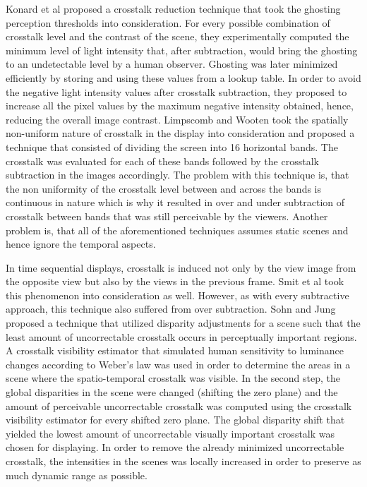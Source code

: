  Konard et al\cite{konrad2000cancellation} proposed a crosstalk reduction technique that took the ghosting perception thresholds into consideration. For every possible combination of crosstalk level and the contrast of the scene, they experimentally computed the minimum level of light intensity that, after subtraction, would bring the ghosting to an undetectable level by a human observer. Ghosting was later minimized efficiently by storing and using these values from a lookup table. In order to avoid the negative light intensity values after crosstalk subtraction, they proposed to increase all the pixel values by the maximum negative intensity obtained, hence, reducing the overall image contrast. Limpscomb and Wooten\cite{lipscomb1994reducing} took the spatially non-uniform nature of crosstalk in the display into consideration and proposed a technique that consisted of dividing the screen into 16 horizontal bands. The crosstalk was evaluated for each of these bands followed by the crosstalk subtraction in the images accordingly. The problem with this technique is, that the non uniformity of the crosstalk level between and across the bands is continuous in nature which is why it resulted in over and under subtraction of crosstalk between bands that was still perceivable by the viewers. Another problem is, that all of the aforementioned techniques assumes static scenes and hence ignore the temporal aspects.

 In time sequential displays, crosstalk is induced not only by the view image from the opposite view but also by the views in the previous frame. Smit et al\cite{smit2007non} took this phenomenon into consideration as well. However, as with every subtractive approach, this technique also suffered from over subtraction. Sohn and Jung\cite{sohn2014crosstalk} proposed a technique that utilized disparity adjustments for a scene such that the least amount of uncorrectable crosstalk occurs in perceptually important regions. A crosstalk visibility estimator that simulated human sensitivity to luminance changes according to Weber's law was used in order to determine the areas in a scene where the spatio-temporal crosstalk was visible. In the second step, the global disparities in the scene were changed (shifting the zero plane) and the amount of perceivable uncorrectable crosstalk was computed using the crosstalk visibility estimator for every shifted zero plane. The global disparity shift that yielded the lowest amount of uncorrectable visually important crosstalk was chosen for displaying. In order to remove the already minimized uncorrectable crosstalk, the intensities in the scenes was locally increased in order to preserve as much dynamic range as possible.

